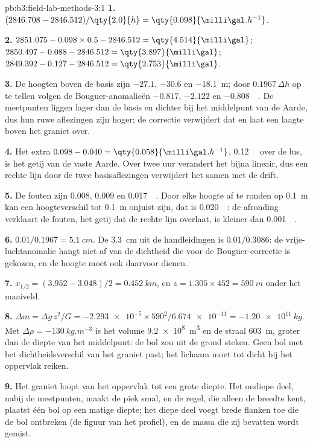 \begin{solution}{pb:b3:field-lab-methods-3:1}
\textbf{1.} $(2846.708 - 2846.512)/\qty{2.0}{h} = \qty{0.098}{\milli\gal.h^{-1}}$.

\textbf{2.} $2851.075 - 0.098\times0.5 - 2846.512 = \qty{4.514}{\milli\gal}$;
$2850.497 - 0.088 - 2846.512 = \qty{3.897}{\milli\gal}$;
$2849.392 - 0.127 - 2846.512 = \qty{2.753}{\milli\gal}$.

\textbf{3.} De hoogten boven de basis zijn $-27.1$, $-30.6$ en
\qty{-18.1}{m}; door $0.1967\,\Delta h$ op te tellen volgen de Bouguer-anomalieën
$\num{-0.817}$, $\num{-2.122}$ en \qty{-0.808}{\milli\gal}. De
meetpunten liggen lager dan de basis en dichter bij het middelpunt van de Aarde,
dus hun ruwe aflezingen zijn hoger; de correctie verwijdert dat en
laat een laagte boven het graniet over.

\textbf{4.} Het extra $0.098 - 0.040 = \qty{0.058}{\milli\gal.h^{-1}}$,
\qty{0.12}{\milli\gal} over de lus, is het getij van de vaste Aarde. Over twee
uur verandert het bijna lineair, dus een rechte lijn door de twee
basisaflezingen verwijdert het samen met de drift.

\textbf{5.} De fouten zijn $\num{0.008}$, $\num{0.009}$ en
\qty{0.017}{\milli\gal}. Door elke hoogte af te ronden op \qty{0.1}{m} kan
een hoogteverschil tot \qty{0.1}{m} onjuist zijn, dat is
\qty{0.020}{\milli\gal}: de afronding verklaart de fouten, het getij dat
de rechte lijn overlaat, is kleiner dan \qty{0.001}{\milli\gal}.

\textbf{6.} $0.01/0.1967 = \qty{5.1}{cm}$. De \qty{3.3}{cm} uit de handleidingen is
$0.01/0.3086$: de vrije-luchtanomalie hangt niet af van de dichtheid
die voor de Bouguer-correctie is gekozen, en de hoogte moet ook daarvoor dienen.

\textbf{7.} $x_{1/2} = (3.952 - 3.048)/2 = \qty{0.452}{km}$, en $z = 1.305
\times452 = \qty{590}{m}$ onder het maaiveld.

\textbf{8.} $\Delta m = \Delta g\,z^2/G = \num{-2.293e-5}\times590^2/
\num{6.674e-11} = \qty{-1.20e11}{kg}$. Met $\Delta\rho =
\qty{-130}{kg.m^{-3}}$ is het volume \qty{9.2e8}{m^3} en de straal
\qty{603}{m}, groter dan de diepte van het middelpunt: de bol zou uit de
grond steken. Geen bol met het dichtheidsverschil van het graniet
past; het lichaam moet tot dicht bij het oppervlak reiken.

\textbf{9.} Het graniet loopt van het oppervlak tot een grote diepte. Het
ondiepe deel, nabij de meetpunten, maakt de piek smal, en de regel, die
alleen de breedte kent, plaatst één bol op een matige diepte; het
diepe deel voegt brede flanken toe die de bol ontbreken (de figuur van het
profiel), en de massa die zij bevatten wordt gemist.


\end{solution}
